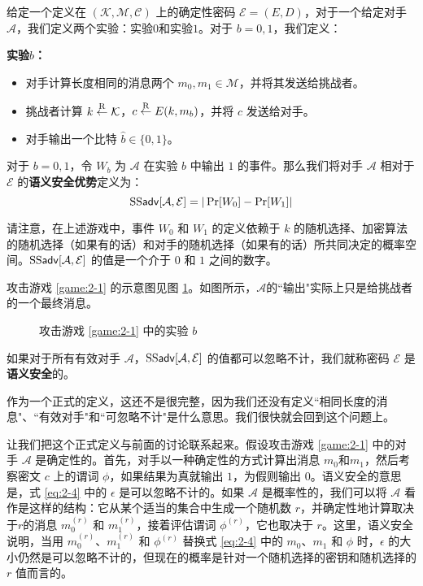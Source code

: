 \begin{game}[语义安全性]\label{game:2-1}
给定一个定义在 $(\mathcal{K},\mathcal{M},\mathcal{C})$ 上的确定性密码 $\mathcal{E}=(E,D)$，对于一个给定对手 $\mathcal{A}$，我们定义两个实验：实验$0$和实验$1$。对于 $b=0,1$，我们定义：

\noindent\textbf{实验$b$：}
\begin{itemize}
	\item 对手计算长度相同的消息两个 $m_0,m_1\in\mathcal{M}$，并将其发送给挑战者。
	\item 挑战者计算 $k\overset{\rm R}\leftarrow\mathcal{K}$，$c\overset{\rm R}\leftarrow E(k,m_b)$，并将 $c$ 发送给对手。
	\item 对手输出一个比特 $\hat b\in\{0,1\}$。
\end{itemize}

对于 $b=0,1$，令 $W_b$ 为 $\mathcal{A}$ 在实验 $b$ 中输出 $1$ 的事件。那么我们将对手 $\mathcal{A}$ 相对于 $\mathcal{E}$ 的\textbf{语义安全优势}定义为：
\[
{\rm SS\mathsf{adv}}[\mathcal{A},\mathcal{E}]=|\Pr[W_0] -\Pr[W_1]|
\]
\end{game}

请注意，在上述游戏中，事件 $W_0$ 和 $W_1$ 的定义依赖于 $k$ 的随机选择、加密算法的随机选择（如果有的话）和对手的随机选择（如果有的话）所共同决定的概率空间。${\rm SS\mathsf{adv}}[\mathcal{A},\mathcal{E}]$ 的值是一个介于 $0$ 和 $1$ 之间的数字。

攻击游戏 \ref{game:2-1} 的示意图见图 \ref{fig:2-1}。如图所示，$\mathcal{A}$的``输出"实际上只是给挑战者的一个最终消息。

\begin{figure}
	\centering
	
	\caption{攻击游戏 \ref{game:2-1} 中的实验 $b$}
	\label{fig:2-1}
\end{figure}

\begin{definition}[语义安全性]\label{def:2-2}
如果对于所有有效对手 $\mathcal{A}$，${\rm SS\mathsf{adv}}[\mathcal{A},\mathcal{E}]$ 的值都可以忽略不计，我们就称密码 $\mathcal{E}$ 是\textbf{语义安全}的。
\end{definition}

作为一个正式的定义，这还不是很完整，因为我们还没有定义``相同长度的消息"、``有效对手"和``可忽略不计"是什么意思。我们很快就会回到这个问题上。

让我们把这个正式定义与前面的讨论联系起来。假设攻击游戏 \ref{game:2-1} 中的对手 $\mathcal{A}$ 是确定性的。首先，对手以一种确定性的方式计算出消息 $m_0$和$m_1$，然后考察密文 $c$ 上的谓词 $\phi$，如果结果为真就输出 $1$，为假则输出 $0$。语义安全的意思是，式 \ref{eq:2-4} 中的 $\epsilon$ 是可以忽略不计的。如果 $\mathcal{A}$ 是概率性的，我们可以将 $\mathcal{A}$ 看作是这样的结构：它从某个适当的集合中生成一个随机数 $r$，并确定性地计算取决于$r$的消息 $m^{(r)}_0$ 和 $m^{(r)}_1$，接着评估谓词 $\phi^{(r)}$，它也取决于 $r$。这里，语义安全说明，当用 $m^{(r)}_0$、$m^{(r)}_1$ 和 $\phi^{(r)}$ 替换式 \ref{eq:2-4} 中的 $m_0$、$m_1$ 和 $\phi$ 时，$\epsilon$ 的大小仍然是可以忽略不计的，但现在的概率是针对一个随机选择的密钥和随机选择的 $r$ 值而言的。

